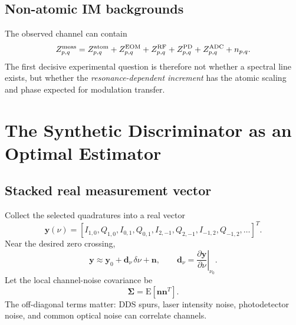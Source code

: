 \documentclass[10pt]{article}
\newcommand{\vect}[1]{\bm{#1}}
\begin{document}
\subsection{Non-atomic IM backgrounds}
The observed channel can contain
\begin{equation}
Z_{p,q}^{\rm meas}=Z_{p,q}^{\rm atom}+Z_{p,q}^{\rm EOM}+Z_{p,q}^{\rm RF}+Z_{p,q}^{\rm PD}+Z_{p,q}^{\rm ADC}+n_{p,q}.
\end{equation}
The first decisive experimental question is therefore not whether a spectral line exists, but whether the \emph{resonance-dependent increment} has the atomic scaling and phase expected for modulation transfer.

\section{The Synthetic Discriminator as an Optimal Estimator}

\subsection{Stacked real measurement vector}
Collect the selected quadratures into a real vector
\begin{equation}
\vect y(\nu)=
[I_{1,0},Q_{1,0},I_{0,1},Q_{0,1},I_{2,-1},Q_{2,-1},I_{-1,2},Q_{-1,2},\ldots]^T.
\end{equation}
Near the desired zero crossing,
\begin{equation}
\vect y\approx\vect y_0+\vect d_\nu\,\delta\nu+\vect n,
\qquad
\vect d_\nu=\left.\frac{\partial\vect y}{\partial\nu}\right|_{\nu_0}.
\end{equation}
Let the local channel-noise covariance be
\begin{equation}
\vect\Sigma=\mathrm E[\vect n\vect n^T].
\end{equation}
The off-diagonal terms matter: DDS spurs, laser intensity noise, photodetector noise, and common optical noise can correlate channels.
\end{document}
